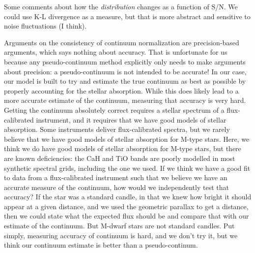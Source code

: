 \documentclass[modern]{aastex631}
\newcommand{\todo}[1]{\textcolor{tab:red}{#1}}
\begin{document}
\todo{Some comments about how the \emph{distribution} changes as a function of S/N. We could use K-L divergence as a measure, but that is more abstract and sensitive to noise fluctuations (I think).}

Arguments on the consistency of continuum normalization are precision-based arguments, which says nothing about accuracy. That is unfortunate for us because any pseudo-continuum method explicitly only needs to make arguments about precision: a pseudo-continuum is not intended to be accurate! In our case, our model is built to try and estimate the true continuum as best as possible by properly accounting for the stellar absorption. While this does likely lead to a more accurate estimate of the continuum, measuring that accuracy is very hard. Getting the continuum absolutely correct requires a stellar spectrum of a flux-calibrated instrument, and it requires that we have good models of stellar absorption. Some instruments deliver flux-calibrated spectra, but we rarely believe that we have good models of stellar absorption for M-type stars. Here, we think we do have good models of stellar absorption for M-type stars, but there are known deficiencies: the CaH and TiO bands are poorly modelled in most synthetic spectral grids, including the one we used. If we think we have a good fit to data from a flux-calibrated instrument such that we believe we have an accurate measure of the continuum, how would we independently test that accuracy? If the star was a standard candle, in that we knew how bright it should appear at a given distance, and we used the geometric parallax to get a distance, then we could state what the expected flux should be and compare that with our estimate of the continuum. But M-dwarf stars are not standard candles. Put simply, measuring accuracy of continuum is hard, and we don't try it, but we think our continuum estimate is better than a pseudo-continum.\\
\end{document}
